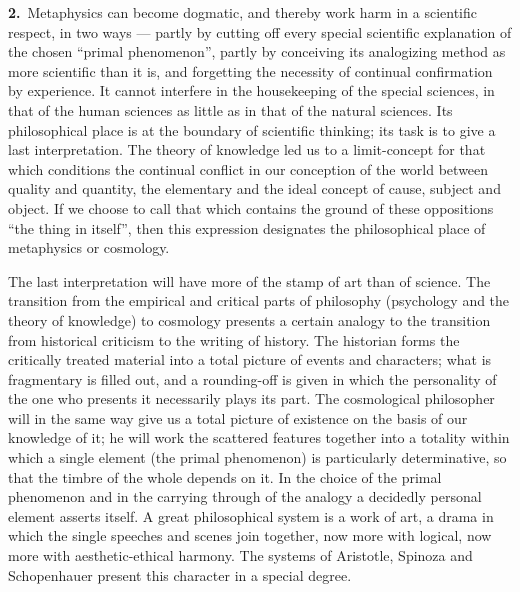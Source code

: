 \documentclass[12pt,a4paper]{book}
\newcommand{\opage}[1]{\marginnote{\footnotesize\textit{[#1]}}}
\begin{document}
\noindent\textbf{2.}~Metaphysics can become dogmatic, and thereby work harm in a
scientific respect, in two ways --- partly by cutting off every special
scientific explanation of the chosen ``primal phenomenon'', partly by conceiving
its analogizing method as more scientific than it is, and forgetting the
necessity of continual confirmation by experience. It cannot interfere in the
housekeeping of the special sciences, in that of the human sciences as little as
in that of the natural sciences. Its philosophical place is at the boundary of
scientific thinking; its task is to give a last interpretation. The theory of
knowledge led us to a limit-concept for that which conditions the continual
conflict in our conception of the world between quality and quantity, the
elementary and the ideal concept of cause, subject and object. If we choose to
call that which contains the ground of these oppositions ``the thing in itself'',
then this expression designates the philosophical place of metaphysics or
cosmology.

The last interpretation will have more of the stamp of art than of science. The
transition from the empirical and critical parts of philosophy (psychology and
the theory of knowledge) to cosmology presents \opage{58}a certain analogy to the
transition from historical criticism to the writing of history. The historian
forms the critically treated material into a total picture of events and
characters; what is fragmentary is filled out, and a rounding-off is given in
which the personality of the one who presents it necessarily plays its part. The
cosmological philosopher will in the same way give us a total picture of
existence on the basis of our knowledge of it; he will work the scattered
features together into a totality within which a single element (the primal
phenomenon) is particularly determinative, so that the timbre of the whole
depends on it. In the choice of the primal phenomenon and in the carrying through
of the analogy a decidedly personal element asserts itself. A great philosophical
system is a work of art, a drama in which the single speeches and scenes join
together, now more with logical, now more with aesthetic-ethical harmony. The
systems of Aristotle, Spinoza and Schopenhauer present this character in a
special degree.
\end{document}
